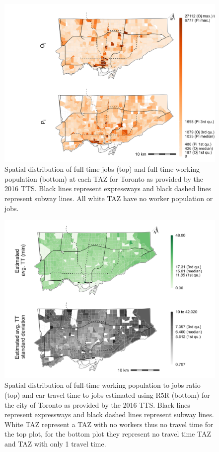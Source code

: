 \documentclass[10pt,letterpaper]{article}
\begin{document}
\begin{figure}
\includegraphics[width=1\linewidth]{images/spatial-dist-jobs-pop-Toronto-plot} \caption{\label{fig:s-dist-Toronto-plot}  Spatial distribution of full-time jobs (top) and full-time working population (bottom) at each TAZ for Toronto as provided by the 2016 TTS. Black lines represent expressways and black dashed lines represent subway lines. All white TAZ have no worker population or jobs.}\label{fig:spatial-dist-Toronto-plot}
\end{figure}

\begin{figure}
\includegraphics[width=1\linewidth]{images/spatial-dist-jobs-pop-Toronto-plot2} \caption{\label{fig:s-dist-Toronto-plot2}  Spatial distribution of full-time working population to jobs ratio (top) and car travel time to jobs estimated using R5R (bottom) for the city of Toronto as provided by the 2016 TTS. Black lines represent expressways and black dashed lines represent subway lines. White TAZ represent a TAZ with no workers thus no travel time for the top plot, for the bottom plot they represent no travel time TAZ and TAZ with only 1 travel time.}\label{fig:spatial-dist-Toronto-plot2}
\end{figure}
\end{document}
